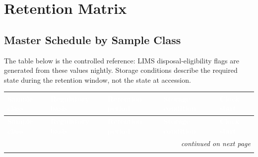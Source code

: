 
\section{Retention Matrix}

\subsection{Master Schedule by Sample Class}
The table below is the controlled reference: LIMS disposal-eligibility flags are generated
from these values nightly. Storage conditions describe the required state during the
retention window, not the state at accession.

\small
\begin{longtable}{@{}p{2.7cm}p{3.5cm}p{2.6cm}p{2.6cm}p{4.4cm}@{}}
\toprule
\rowcolor{inkslate}
\textcolor{white}{\textbf{Sample class}} & \textcolor{white}{\textbf{Regulatory basis}} &
\textcolor{white}{\textbf{Retention period}} & \textcolor{white}{\textbf{Storage condition}} &
\textcolor{white}{\textbf{Clock start}} \\
\midrule
\endfirsthead
\rowcolor{inkslate}
\textcolor{white}{\textbf{Sample class}} & \textcolor{white}{\textbf{Regulatory basis}} &
\textcolor{white}{\textbf{Retention period}} & \textcolor{white}{\textbf{Storage condition}} &
\textcolor{white}{\textbf{Clock start}} \\
\midrule
\endhead
\midrule
\multicolumn{5}{r}{\footnotesize\itshape continued on next page}\\
\endfoot
\bottomrule
\endlastfoot


\end{longtable}

